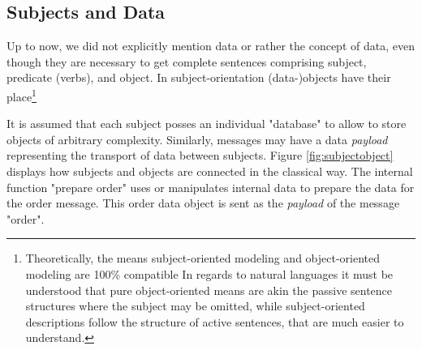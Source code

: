 
\subsection{Subjects and Data}
\label{SUbjects-Objects}

Up to now, we did not explicitly mention data or rather the concept of data, even though they are necessary to get complete sentences comprising subject, predicate (verbs), and object. In subject-orientation (data-)objects have their place\footnote{Theoretically, the means subject-oriented modeling and object-oriented modeling are 100\% compatible In regards to natural languages it must be understood that pure object-oriented means are akin the passive sentence structures where the subject may be omitted, while subject-oriented descriptions follow the structure of active sentences, that are much easier to understand. }


It is assumed that each subject posses an individual "database" to allow to store objects of arbitrary complexity. Similarly, messages may have a data \textit{payload} representing the transport of data between subjects.
Figure \ref{fig:subjectobject} displays how subjects and objects are connected in the classical way. The internal function  "prepare order" uses or manipulates internal data to prepare the data for the order message. This order data object is sent as the \textit{payload} of the message "order".

